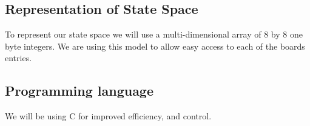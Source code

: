 \documentclass[12pt]{article}
\begin{document}
\subsection*{Representation of State Space}
To represent our state space we will use a multi-dimensional array of 8 by 8 one byte integers.
We are using this model to allow easy access to each of the boards entries.

\subsection*{Programming language}
We will be using C for improved efficiency, and control.
\end{document}
